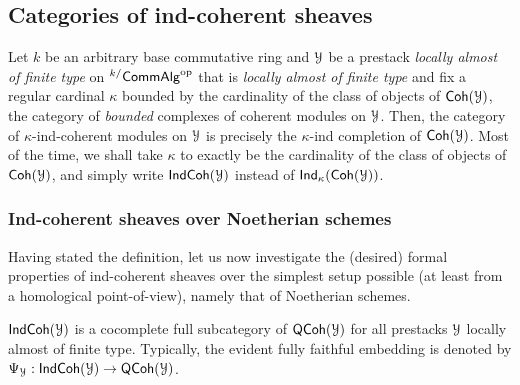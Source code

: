         \subsection{Categories of ind-coherent sheaves}
            \begin{definition} \label{def: ind_coherent_modules}
                Let $k$ be an arbitrary base commutative ring and $\mathcal{Y}$ be a prestack \textit{locally almost of finite type} on ${}^{k/}\mathsf{Comm}\mathsf{Alg}^{\mathrm{op}}$ that is \textit{locally almost of finite type} and fix a regular cardinal $\kappa$ bounded by the cardinality of the class of objects of $\mathsf{Coh}(\mathcal{Y})$, the category of \textit{bounded} complexes of coherent modules on $\mathcal{Y}$. Then, the category of $\kappa$-ind-coherent modules on $\mathcal{Y}$ is precisely the $\kappa$-ind completion of $\mathsf{Coh}(\mathcal{Y})$. Most of the time, we shall take $\kappa$ to exactly be the cardinality of the class of objects of $\mathsf{Coh}(\mathcal{Y})$, and simply write $\mathsf{Ind}\mathsf{Coh}(\mathcal{Y})$ instead of $\mathsf{Ind}_{\kappa}(\mathsf{Coh}(\mathcal{Y}))$. 
            \end{definition}
        
            \subsubsection{Ind-coherent sheaves over Noetherian schemes}
                Having stated the definition, let us now investigate the (desired) formal properties of ind-coherent sheaves over the simplest setup possible (at least from a homological point-of-view), namely that of Noetherian schemes. 
                \begin{convention} \label{conv: indcoh_to_qcoh_functor}
                    $\mathsf{Ind}\mathsf{Coh}(\mathcal{Y})$ is a cocomplete full subcategory of $\mathsf{QCoh}(\mathcal{Y})$ for all prestacks $\mathcal{Y}$ locally almost of finite type. Typically, the evident fully faithful embedding is denoted by $\Psi_{\mathcal{Y}}: \mathsf{Ind}\mathsf{Coh}(\mathcal{Y}) \to \mathsf{QCoh}(\mathcal{Y})$. 
                \end{convention}
                
